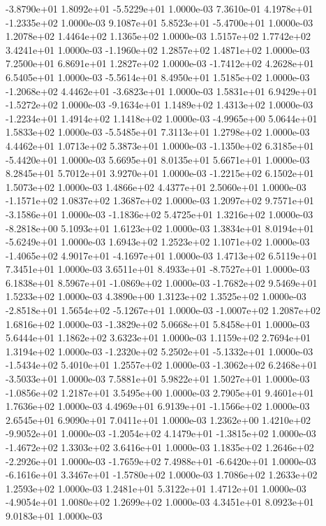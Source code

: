-3.8790e+01  1.8092e+01 -5.5229e+01  1.0000e-03
 7.3610e-01  4.1978e+01 -1.2335e+02  1.0000e-03
 9.1087e+01  5.8523e+01 -5.4700e+01  1.0000e-03
1.2078e+02 1.4464e+02 1.1365e+02  1.0000e-03
1.5157e+02 1.7742e+02 3.4241e+01  1.0000e-03
-1.1960e+02  1.2857e+02  1.4871e+02  1.0000e-03
7.2500e+01 6.8691e+01 1.2827e+02  1.0000e-03
-1.7412e+02  4.2628e+01  6.5405e+01  1.0000e-03
-5.5614e+01  8.4950e+01  1.5185e+02  1.0000e-03
-1.2068e+02  4.4462e+01 -3.6823e+01  1.0000e-03
 1.5831e+01  6.9429e+01 -1.5272e+02  1.0000e-03
-9.1634e+01  1.1489e+02  1.4313e+02  1.0000e-03
-1.2234e+01  1.4914e+02  1.1418e+02  1.0000e-03
-4.9965e+00  5.0644e+01  1.5833e+02  1.0000e-03
-5.5485e+01  7.3113e+01  1.2798e+02  1.0000e-03
4.4462e+01 1.0713e+02 5.3873e+01  1.0000e-03
-1.1350e+02  6.3185e+01 -5.4420e+01  1.0000e-03
5.6695e+01 8.0135e+01 5.6671e+01  1.0000e-03
8.2845e+01 5.7012e+01 3.9270e+01  1.0000e-03
-1.2215e+02  6.1502e+01  1.5073e+02  1.0000e-03
1.4866e+02 4.4377e+01 2.5060e+01  1.0000e-03
-1.1571e+02  1.0837e+02  1.3687e+02  1.0000e-03
 1.2097e+02  9.7571e+01 -3.1586e+01  1.0000e-03
-1.1836e+02  5.4725e+01  1.3216e+02  1.0000e-03
-8.2818e+00  5.1093e+01  1.6123e+02  1.0000e-03
 1.3834e+01  8.0194e+01 -5.6249e+01  1.0000e-03
1.6943e+02 1.2523e+02 1.1071e+02  1.0000e-03
-1.4065e+02  4.9017e+01 -4.1697e+01  1.0000e-03
1.4713e+02 6.5119e+01 7.3451e+01  1.0000e-03
 3.6511e+01  8.4933e+01 -8.7527e+01  1.0000e-03
 6.1838e+01  8.5967e+01 -1.0869e+02  1.0000e-03
-1.7682e+02  9.5469e+01  1.5233e+02  1.0000e-03
4.3890e+00 1.3123e+02 1.3525e+02  1.0000e-03
-2.8518e+01  1.5654e+02 -5.1267e+01  1.0000e-03
-1.0007e+02  1.2087e+02  1.6816e+02  1.0000e-03
-1.3829e+02  5.0668e+01  5.8458e+01  1.0000e-03
5.6444e+01 1.1862e+02 3.6323e+01  1.0000e-03
1.1159e+02 2.7694e+01 1.3194e+02  1.0000e-03
-1.2320e+02  5.2502e+01 -5.1332e+01  1.0000e-03
-1.5434e+02  5.4010e+01  1.2557e+02  1.0000e-03
-1.3062e+02  6.2468e+01 -3.5033e+01  1.0000e-03
7.5881e+01 5.9822e+01 1.5027e+01  1.0000e-03
-1.0856e+02  1.2187e+01  3.5495e+00  1.0000e-03
2.7905e+01 9.4601e+01 1.7636e+02  1.0000e-03
 4.4969e+01  6.9139e+01 -1.1566e+02  1.0000e-03
2.6545e+01 6.9090e+01 7.0411e+01  1.0000e-03
 1.2362e+00  1.4210e+02 -9.9052e+01  1.0000e-03
-1.2054e+02  4.1479e+01 -1.3815e+02  1.0000e-03
-1.4672e+02  1.3303e+02  3.6416e+01  1.0000e-03
 1.1835e+02  1.2646e+02 -2.2926e+01  1.0000e-03
-1.7659e+02  7.4988e+01 -6.6420e+01  1.0000e-03
-6.1616e+01  3.3467e+01 -1.5780e+02  1.0000e-03
1.7086e+02 1.2633e+02 1.2593e+02  1.0000e-03
1.2481e+01 5.3122e+01 1.4712e+01  1.0000e-03
-4.9054e+01  1.0080e+02  1.2699e+02  1.0000e-03
4.3451e+01 8.0923e+01 9.0183e+01  1.0000e-03
